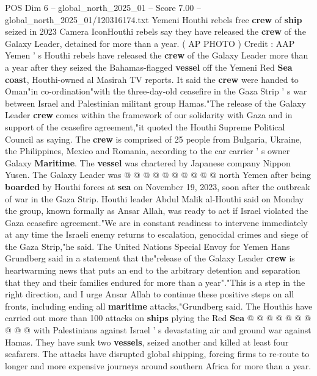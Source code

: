 \begin{textsample}{POS Dim 6 – global\_north\_2025\_01 – Score 7.00 – global\_north\_2025\_01/120316174.txt}  \label{ex:f6_pos_273}
Yemeni Houthi rebels free \textbf{crew} of \textbf{ship} seized in 2023 Camera IconHouthi rebels say they have released the \textbf{crew} of the Galaxy Leader, detained for more than a year. ( AP PHOTO ) Credit : AAP Yemen ' s Houthi rebels have released the \textbf{crew} of the Galaxy Leader more than a year after they seized the Bahamas-flagged \textbf{vessel} off the Yemeni Red \textbf{Sea} \textbf{coast}, Houthi-owned al Masirah TV reports.
It said the \textbf{crew} were handed to Oman"in co-ordination"with the three-day-old ceasefire in the Gaza Strip ' s war between Israel and Palestinian militant group Hamas."The release of the Galaxy Leader \textbf{crew} comes within the framework of our solidarity with Gaza and in support of the ceasefire agreement,"it quoted the Houthi Supreme Political Council as saying.
The \textbf{crew} is comprised of 25 people from Bulgaria, Ukraine, the Philippines, Mexico and Romania, according to the car carrier ' s owner Galaxy \textbf{Maritime}.
The \textbf{vessel} was chartered by Japanese company Nippon Yusen.
The Galaxy Leader was @ @ @ @ @ @ @ @ @ @ north Yemen after being \textbf{boarded} by Houthi forces at \textbf{sea} on November 19, 2023, soon after the outbreak of war in the Gaza Strip.
Houthi leader Abdul Malik al-Houthi said on Monday the group, known formally as Ansar Allah, was ready to act if Israel violated the Gaza ceasefire agreement."We are in constant readiness to intervene immediately at any time the Israeli enemy returns to escalation, genocidal crimes and siege of the Gaza Strip,"he said.
The United Nations Special Envoy for Yemen Hans Grundberg said in a statement that the"release of the Galaxy Leader \textbf{crew} is heartwarming news that puts an end to the arbitrary detention and separation that they and their families endured for more than a year"."This is a step in the right direction, and I urge Ansar Allah to continue these positive steps on all fronts, including ending all \textbf{maritime} attacks,"Grundberg said.
The Houthis have carried out more than 100 attacks on \textbf{ships} plying the Red \textbf{Sea} @ @ @ @ @ @ @ @ @ @ with Palestinians against Israel ' s devastating air and ground war against Hamas.
They have sunk two \textbf{vessels}, seized another and killed at least four seafarers.
The attacks have disrupted global shipping, forcing firms to re-route to longer and more expensive journeys around southern Africa for more than a year.

\end{textsample}
